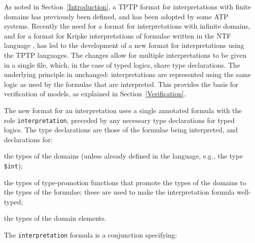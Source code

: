 \documentclass[letterpaper]{article}
\newcommand{\smalltt}[1]{\small \texttt{#1}}
\newenvironment{packed_itemize}{
\vspace*{-0.2em}
\begin{itemize}
\setlength{\partopsep}{0pt}
\setlength{\itemsep}{1pt}
\setlength{\parskip}{0pt}
\setlength{\parsep}{0pt}
}{\end{itemize}}
\begin{document}
As noted in Section~\ref{Introduction}, a TPTP format for interpretations with finite domains 
has previously been defined, and has been adopted by some ATP systems.
Recently the need for a format for interpretations with infinite domains, and for a format for 
Kripke interpretations \cite{Kri63} of formulae written in the NTF language \cite{SF+22}, has 
led to the development of a new format for interpretations using the TPTP languages.
The changes allow for multiple interpretations to be given in a single file, which, in the case
of typed logics, share type declarations.
The underlying principle in unchanged: interpretations are represented using the same logic
as used by the formulae that are interpreted.
This provides the basis for verification of models, as explained in Section~\ref{Verification}.

The new format for an interpretation uses a single annotated formula with the role 
\smalltt{interpretation}, preceded by any necessary type declarations for typed logics.
The type declarations are those of the formulae being interpreted, and declarations for:
\begin{packed_itemize}
\item the types of the domains (unless already defined in the language, e.g., the type
      \smalltt{\$int});
\item the types of type-promotion functions that promote the types of the domains to the types 
      of the formulae; these are used to make the interpretation formula well-typed;
\item the types of the domain elements.
\end{packed_itemize}
The \smalltt{interpretation} formula is a conjunction specifying: 
\end{document}
